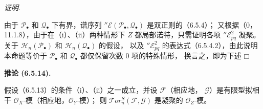 \documentclass[UTF8,fontset=none,11pt,oneside,openany]{ctexbook}
\providecommand{\square}{\mdlgwhtsquare}
\newenvironment{corollary}[1][]{%
  \par\medskip\noindent\textbf{推论 (#1).}\ %
}{\par}
\newenvironment{proof}{%
  \par\smallskip\noindent\textit{证明.}\ %
}{\hfill$\square$\par}
\begin{document}
\begin{proof}
由于 $\mathscr P_\bullet$ 和 $\mathscr Q_\bullet$ 下有界，谱序列
$''\mathscr E(\mathscr P_\bullet,\mathscr Q_\bullet)$ 是双正则的（6.5.4）；
又根据（0，11.1.8），由于在（i）、（ii）两种情形下 $Z$ 都局部诺特，只需证明各项
$''\mathscr E_{pq}^2$ 凝聚。关于
$\mathscr H_n(\mathscr P_\bullet)$ 和 $\mathscr H_n(\mathscr Q_\bullet)$ 的假设，
以及 $''\mathscr E_{pq}^2$ 的表达式（6.5.4.2），由此说明本命题等价于
$\mathscr P_\bullet$ 和 $\mathscr Q_\bullet$ 都仅保留次数 0 项的特殊情形，
换言之，即为下述
\end{proof}

\begin{corollary}[6.5.14]
假设（6.5.13）的条件（i）、（ii）之一成立，并设 $\mathscr F$（相应地，
$\mathscr G$）是有限型拟相干 $\mathscr O_X$-模（相应地，$\mathscr O_Y$-模）；
则 $\mathscr{T}\!or_n^S(\mathscr F,\mathscr G)$ 是凝聚的 $\mathscr O_Z$-模。
\end{corollary}
\end{document}
